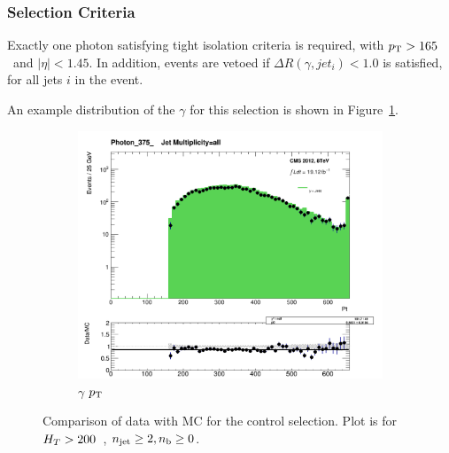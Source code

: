 \subsubsection{Selection Criteria}
Exactly one photon satisfying tight isolation criteria is required, with 
${p_{\text T}} > 165$~\gev and $|\eta|<1.45$. In addition, events are vetoed if
$\Delta R(\gamma, jet_i)<1.0$ is satisfied, for all jets $i$ in the event.

An example distribution of the $\gamma$ \Pt for this selection is shown
in Figure~\ref{fig:datamc_pho_inc}.

\begin{figure}[!ht]
  \centering
    \begin{subfigure}[b]{0.48\textwidth}
      \includegraphics[width=\textwidth]{Figs/datamc/pho/Stacked_PhotonPt_all_Photon_375_upwards}
      \caption{$\gamma$ ${p_{\text T}}$}
    \end{subfigure}
    \caption{\label{fig:datamc_pho_inc}
    Comparison of data with MC for the \gj control selection. Plot 
    is for $H_T>200$~\gev, $n_{\text{jet}}\geq2, n_{\text{b}}\geq0$.}
\end{figure}



